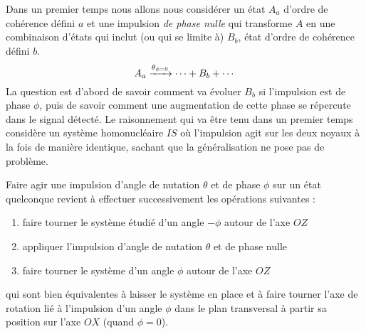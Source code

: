 Dans un premier temps nous allons nous considérer un état $A_a$ d'ordre de cohérence défini $a$
et une impulsion \emph{de phase nulle} qui transforme $A$ en une combinaison d'états
qui inclut (ou qui se limite à) $B_b$, état d'ordre de cohérence défini $b$.
\begin{equation}
\label{eqn:generaltransfer}
A_a \xrightarrow{\theta_{\phi=0}} \cdots + B_b + \cdots
\end{equation}
La question est d'abord de savoir comment 
va évoluer $B_b$ si l'impulsion est de phase $\phi$,
puis de savoir comment une augmentation de cette phase se
répercute dans le signal détecté.
Le raisonnement qui va être tenu dans un premier temps 
considère un système homonucléaire $IS$ où l'impulsion agit
sur les deux noyaux à la fois de manière identique, sachant que la généralisation
ne pose pas de problème.

Faire agir une impulsion d'angle de nutation $\theta$ et de phase $\phi$ 
sur un état quelconque revient à effectuer successivement les opérations suivantes :
\begin{enumerate}
\item faire tourner le système étudié d'un angle $-\phi$ autour de l'axe $OZ$
\item appliquer l'impulsion d'angle de nutation $\theta$ et de phase nulle
\item faire tourner le système d'un angle $\phi$ autour de l'axe $OZ$
\end{enumerate}
qui sont bien équivalentes à laisser le système en place et à faire tourner
l'axe de rotation lié à l'impulsion d'un angle $\phi$ dans le plan transversal
à partir sa position sur l'axe $OX$ (quand $\phi=0$).

